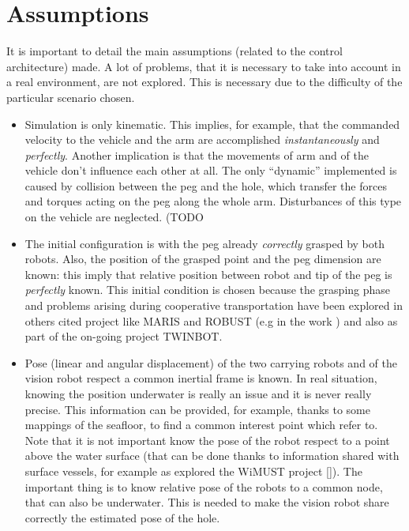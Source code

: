 \section{Assumptions}
It is important to detail the main assumptions (related to the control architecture) made. A lot of problems, that it is necessary to take into account in a real environment, are not explored. This is necessary due to the difficulty of the particular scenario chosen.
\begin{itemize}
	\item Simulation is only kinematic. This implies, for example, that the commanded velocity to the vehicle and the arm are accomplished \textit{instantaneously} and \textit{perfectly}. Another implication is that the movements of arm and of the vehicle don't influence each other at all. The only \enquote{dynamic} implemented is caused by collision between the peg and the hole, which transfer the forces and torques acting on the peg along the whole arm. Disturbances of this type on the vehicle are neglected. (TODO %
	
	\item The initial configuration is with the peg already \textit{correctly} grasped by both robots. Also, the position of the grasped point and the peg dimension are known: this imply that relative position between robot and tip of the peg is \textit{perfectly} known. This initial condition is chosen because the grasping phase and problems arising during cooperative transportation have been explored in others cited project like MARIS and ROBUST (e.g in the work \cite{IntroMaris2}) and also as part of the on-going project TWINBOT.
	
	
	\item Pose (linear and angular displacement) of the two carrying robots and of the vision robot respect a common inertial frame is known. In real situation, knowing the position underwater is really an issue and it is never really precise. This information can be provided, for example, thanks to some mappings of the seafloor, to find a common interest point which refer to. Note that it is not important know the pose of the robot respect to a point above the water surface (that can be done thanks to information shared with surface vessels, for example as explored the WiMUST project [\cite{wimust}]). The important thing is to know relative pose of the robots to a common node, that can also be underwater. This is needed to make the vision robot share correctly the estimated pose of the hole.
	

\end{itemize}
